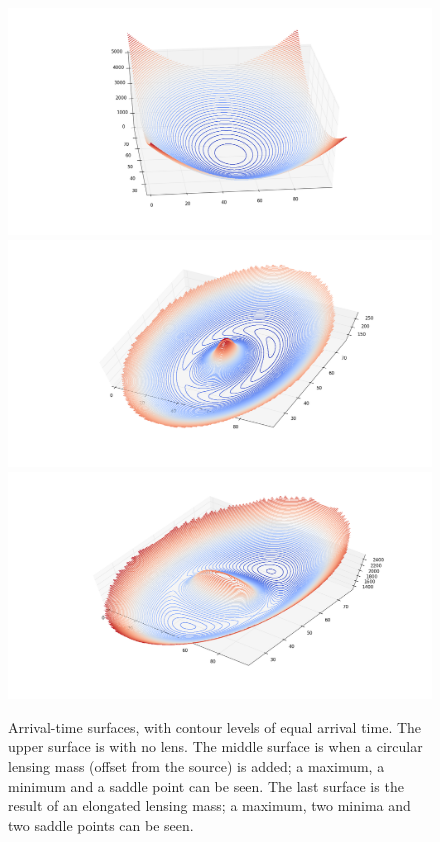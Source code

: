 \documentclass[12pt,preprint]{aastex}
\begin{document}
\begin{figure}
\centering
\includegraphics[height=.3\vsize]{fig/arriv1.png}
\includegraphics[height=.3\vsize]{fig/arriv2.png}
\includegraphics[height=.3\vsize]{fig/arriv3.png}
\caption{Arrival-time surfaces, with contour levels of equal arrival
  time.  The upper surface is with no lens.  The middle surface is
  when a circular lensing mass (offset from the source) is added; a
  maximum, a minimum and a saddle point can be seen.  The last surface
  is the result of an elongated lensing mass; a maximum, two minima
  and two saddle points can be seen.
}
\label{fig:arriv}
\end{figure}
\end{document}
